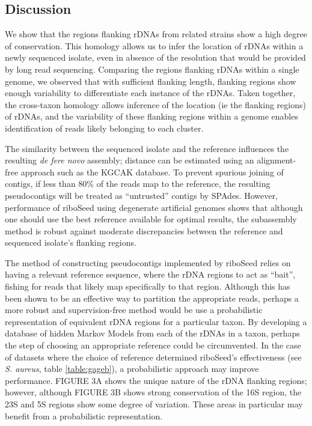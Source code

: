 \documentclass[11pt]{article}
\begin{document}
\begin{linenumbers}
\section*{Discussion}
We show that the regions flanking rDNAs from related strains show a high degree of conservation. This homology allows us to infer the location of rDNAs within a newly sequenced isolate, even in absence of the resolution that would be provided by long read sequencing. Comparing the regions flanking rDNAs within a single genome, we observed that with sufficient flanking length, flanking regions show enough variability to differentiate each instance of the rDNAs. Taken together, the cross-taxon homology allows inference of the location (ie the flanking regions) of rDNAs, and the variability of these flanking regions within a genome enables identification of reads likely belonging to each cluster.


The similarity between the sequenced isolate and the reference influences the resulting \textit{de fere novo} assembly; distance can be estimated using an alignment-free approach such as the KGCAK database\cite{Wang2015b}. To prevent spurious joining of contigs, if less than 80\% of the reads map to the reference, the resulting pseudocontigs will be treated as “untrusted” contigs by SPAdes. However, performance of riboSeed using degenerate artificial genomes shows that although one should use the best reference available for optimal results, the subassembly method is robust against moderate discrepancies between the reference and sequenced isolate’s flanking regions.



The method of constructing pseudocontigs implemented by riboSeed relies on having a relevant reference sequence, where the rDNA regions to act as “bait”, fishing for reads that likely map specifically to that region. Although this has been shown to be an effective way to partition the appropriate reads, perhaps a more robust and supervision-free method would be use a probabilistic representation of equivalent rDNA regions for a particular taxon. By developing a database of hidden Markov Models from each of the rDNAs in a taxon, perhaps the step of choosing an appropriate reference could be circumvented. In the case of datasets where the choice of reference determined riboSeed’s effectiveness (see \textit{S. aureus}, table \ref{table:gageb}), a probabilistic approach may improve performance. FIGURE 3A shows the unique nature of the rDNA flanking regions; however, although FIGURE 3B shows strong conservation of the 16S region, the 23S and 5S regions show some degree of variation.  These areas in particular may benefit from a probabilistic representation.



\end{linenumbers}
\end{document}

